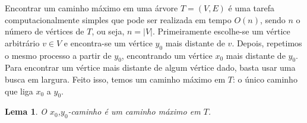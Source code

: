 \documentclass[a4paper,12pt]{article}
\newtheorem{lem}{Lema}
\begin{document}
	Encontrar um caminho máximo em uma árvore $T=(V,E)$ é uma tarefa
	computacionalmente simples que pode ser realizada em tempo 
	$O(n)$, sendo $n$ o número de vértices de $T$, ou seja, 
	$n = |V|$. 
	Primeiramente escolhe-se um vértice arbitrário
	$v \in V$ e encontra-se um vértice $y_0$ mais distante de 
	$v$.
	Depois, repetimos o mesmo processo a partir de $y_0$, 
	encontrando um vértice
	$x_0$ mais distante de $y_0$. 
	Para encontrar um vértice mais distante de algum vértice dado, 
	basta usar uma busca em largura.  
	Feito isso, temos um caminho máximo em $T$: o único
	caminho que liga $x_0$ a $y_0$.

	\bigskip

	\begin{lem}
		O $x_0$,$y_0$-caminho é um caminho máximo em $T$.
	\end{lem}

	\bigskip
\end{document}

